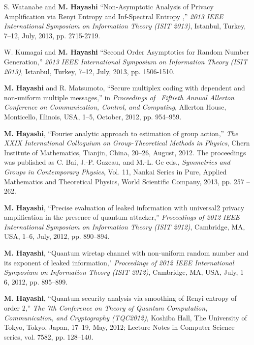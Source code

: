 \documentclass[a4paper,12pt,oneside]{article}
\begin{document}
\begin{enumerate}
S. Watanabe and \textbf{M. Hayashi}
``Non-Asymptotic Analysis of Privacy Amplification via Renyi Entropy and Inf-Spectral Entropy ,'' 
{\em 2013 IEEE International Symposium on Information Theory (ISIT 2013)}, 
Istanbul, Turkey, 7--12, July, 2013, pp. 2715-2719.

W. Kumagai and \textbf{M. Hayashi}
``Second Order Asymptotics for Random Number Generation,'' 
{\em 2013 IEEE International Symposium on Information Theory (ISIT 2013)}, 
Istanbul, Turkey, 7--12, July, 2013, pp. 1506-1510.

 \textbf{M. Hayashi} and R. Matsumoto, 
``Secure multiplex coding with dependent and non-uniform multiple messages,''
in  \emph{Proceedings of \ Fiftieth Annual Allerton Conference on Communication, Control, and Computing}, 
Allerton House, Monticello, Illinois, USA, 1--5, October, 2012, pp. 954--959.

\textbf{M. Hayashi}, ``Fourier analytic approach to estimation of group action,'' 
{\em The XXIX International Colloquium on Group-Theoretical Methods in Physics}, 
Chern Institute of Mathematics, Tianjin, China, 20--26, August, 2012.
The proceedings was published as 
C. Bai, J.-P. Gazeau, and M.-L. Ge eds.,
{\em Symmetries and Groups in Contemporary Physics},
Vol. 11, Nankai Series in Pure, Applied Mathematics and Theoretical Physics,
World Scientific Company, 2013, pp. 257 -- 262.

\textbf{M. Hayashi}, 
``Precise evaluation of leaked information with universal2 privacy amplification in the presence of quantum attacker,'' 
{\em Proceedings of 2012 IEEE International Symposium on Information Theory (ISIT 2012)}, 
Cambridge, MA, USA, 1--6, July, 2012, pp. 890--894. 

	\textbf{M. Hayashi}, 
``Quantum wiretap channel with non-uniform random number and its exponent of leaked information," 
{\em Proceedings of 2012 IEEE International Symposium on Information Theory (ISIT 2012)}, 
Cambridge, MA, USA, July, 1--6, 2012, pp. 895--899. 

	\textbf{M. Hayashi}, 
``Quantum security analysis via smoothing of Renyi entropy of order 2,''
{\em The 7th Conference on Theory of Quantum Computation, Communication, and Cryptography (TQC2012)}, 
Koshiba Hall, The University of Tokyo, Tokyo, Japan, 17--19, May, 2012; 
Lecture Notes in Computer Science series, vol. 7582, pp. 128--140.


\end{enumerate}
\end{document}
